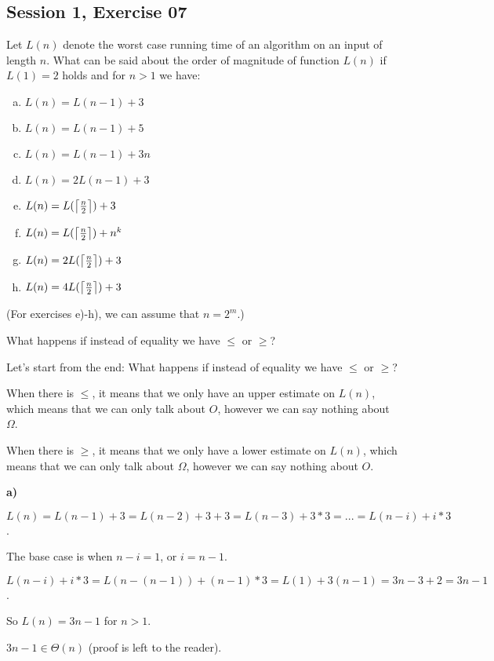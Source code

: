 \subsection{Session 1, Exercise 07}


Let $L(n)$ denote the worst case running time of an algorithm on an input of length $n$. What can be said about the order of magnitude of function $L(n)$ if $L(1) = 2$ holds and for $n>1$ we have:

\begin{enumerate}[a.)]
    \item $L(n) = L(n-1) + 3$
    \item $L(n) = L(n-1) + 5$
    \item $L(n) = L(n-1) + 3n$
    \item $L(n) = 2L(n-1) + 3$
    \item $L(n) = L(\ceil*{\frac{n}{2}}) + 3$
    \item $L(n) = L(\ceil*{\frac{n}{2}}) + n^k$
    \item $L(n) = 2L(\ceil*{\frac{n}{2}}) + 3$
    \item $L(n) = 4L(\ceil*{\frac{n}{2}}) + 3$
\end{enumerate}

(For exercises e)-h), we can assume that $n=2^m$.)

What happens if instead of equality we have $\leq{}$ or $\geq{}$?


Let's start from the end: What happens if instead of equality we have $\leq{}$ or $\geq{}$?

When there is $\leq{}$, it means that we only have an upper estimate on $L(n)$, which means that we can only talk about $O$, however we can say nothing about $\Omega$.

When there is $\geq{}$, it means that we only have a lower estimate on $L(n)$, which means that we can only talk about $\Omega$, however we can say nothing about $O$.

\textbf{a)}

$L(n) = L(n-1) + 3 = L(n-2) + 3 + 3 = L(n-3) + 3*3 = ... = L(n-i) + i*3$.

The base case is when $n-i=1$, or $i=n-1$.

$ L(n-i) + i*3 = L(n-(n-1)) + (n-1)*3 = L(1) + 3(n-1) = 3n - 3 + 2 = 3n-1$.

So $L(n) = 3n-1$ for $n>1$.

$3n-1 \in{} \Theta(n)$ (proof is left to the reader).

